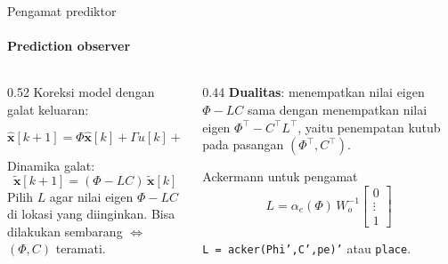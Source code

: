 \documentclass[aspectratio=169,10pt]{beamer}
\begin{document}
\begin{frame}{Pengamat prediktor}
	\framesubtitle{Prediction observer}
	\begin{columns}[c]
		\begin{column}{0.52\textwidth}
			\small
			Koreksi model dengan galat keluaran:
			\begin{block}{}
				\[
					\hat{\mathbf{x}}[k+1] = \Phi\hat{\mathbf{x}}[k] + \Gamma u[k] + L\big(y[k] - C\hat{\mathbf{x}}[k]\big)
				\]
			\end{block}
			Dinamika galat:
			\[
				\tilde{\mathbf{x}}[k+1] = (\Phi - LC)\,\tilde{\mathbf{x}}[k]
			\]
			Pilih $L$ agar nilai eigen $\Phi - LC$ di lokasi yang diinginkan. Bisa dilakukan sembarang $\iff$ $(\Phi, C)$ teramati.
		\end{column}
		\begin{column}{0.44\textwidth}
			\small
			\textbf{Dualitas}: menempatkan nilai eigen $\Phi - LC$ sama dengan menempatkan nilai eigen $\Phi^\top - C^\top L^\top$, yaitu penempatan kutub pada pasangan $(\Phi^\top, C^\top)$.
			\begin{block}{Ackermann untuk pengamat}
				\[
					L = \alpha_e(\Phi)\,W_o^{-1}\begin{bmatrix}0\\ \vdots\\ 1\end{bmatrix}
				\]
			\end{block}
			{\scriptsize \texttt{L = acker(Phi',C',pe)'} atau \texttt{place}.}
		\end{column}
	\end{columns}
\end{frame}
\end{document}
